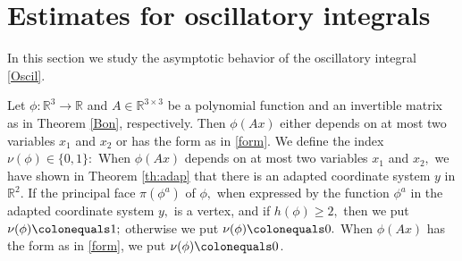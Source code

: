 \documentclass[a4paper, 11pt]{article}
\theoremstyle{plain}
\theoremstyle{definition}
\theoremstyle{lemma}
\newtheorem{lemma}[theorem]{Lemma}
\theoremstyle{Remark}
\newtheorem{Remark}[theorem]{Remark}
\theoremstyle{proposition}
\theoremstyle{corollary}
\theoremstyle{example}
\theoremstyle{assumption}
\begin{document}

\section{Estimates for oscillatory integrals}


In this section we study the asymptotic behavior of the oscillatory integral \eqref{Oscil}.


Let $\phi:\mathbb{R}^3\to \mathbb{R}$ and $A\in \mathbb{R}^{3\times 3}$ be a polynomial function and an invertible matrix as in Theorem \ref{Bon}, respectively. Then $ \phi(Ax)$ either depends on at most two variables $x_1$ and $x_2$ or has the form as in \eqref{form}. We define the index $\nu(\phi)\in \{0,1\}:$ When
$ \phi(Ax)$  depends on at most two variables $x_1$ and $x_2,$    we have shown in Theorem \ref{th:adap} that there is an adapted coordinate system $y$ in $\mathbb{R}^2.$ If the principal face $\pi(\phi^a)$ of $\phi,$ when expressed by the function $\phi^a$ in the adapted coordinate system $y,$  is a vertex, and if $h(\phi)\geq 2,$ then we put $\nu(\phi)\colonequals 1;$ otherwise we put $\nu(\phi)\colonequals 0.$
 When $\phi(Ax) $ has the form as in \eqref{form}, we  put $\nu(\phi)\colonequals 0$.
\end{document}
